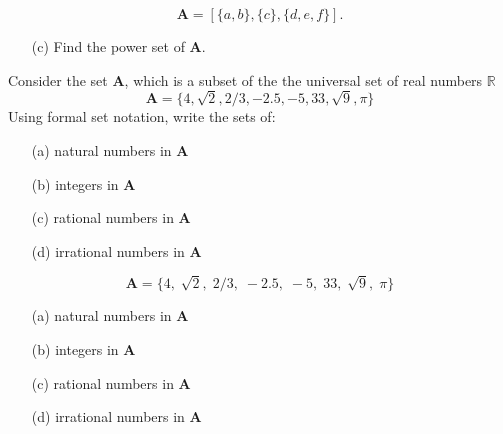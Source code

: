 \documentclass[11pt,a4paper,titlepage,oneside,openany]{article}
\numberwithin{equation}{section}
\numberwithin{algorithm}{section}
\numberwithin{figure}{section}
\numberwithin{table}{section}
\begin{document}
{\[\boldsymbol{A} = [\{a, b\}, \{c\},\{d, e, f \}]. \]
\begin{itemize}
\item[(c)] Find the power set of \textbf{A}. 
\end{itemize}


Consider the set \textbf{A}, which is a subset of the the universal set of real numbers $\mathbb{R}$
 \[\boldsymbol{A} = \{4, \sqrt{2}, 2/3, -2.5, -5, 33, \sqrt{9}, \pi \}\]
Using formal set notation, write the sets of:
\begin{itemize}
\item[(a)] natural numbers in \textbf{A}
\item[(b)] integers in \textbf{A}
\item[(c)] rational numbers in \textbf{A}
\item[(d)] irrational numbers in \textbf{A}
\end{itemize}



\[\boldsymbol{A} = \{4,\; \sqrt{2},\; 2/3,\; -2.5,\; -5,\; 33,\; \sqrt{9},\; \pi \}\]
\begin{itemize}
\item[(a)] natural numbers in \textbf{A}\\
\item[(b)] integers in \textbf{A}\\
\item[(c)] rational numbers in \textbf{A}\\
\item[(d)] irrational numbers in \textbf{A}\\
\end{itemize}




}
\end{document}
